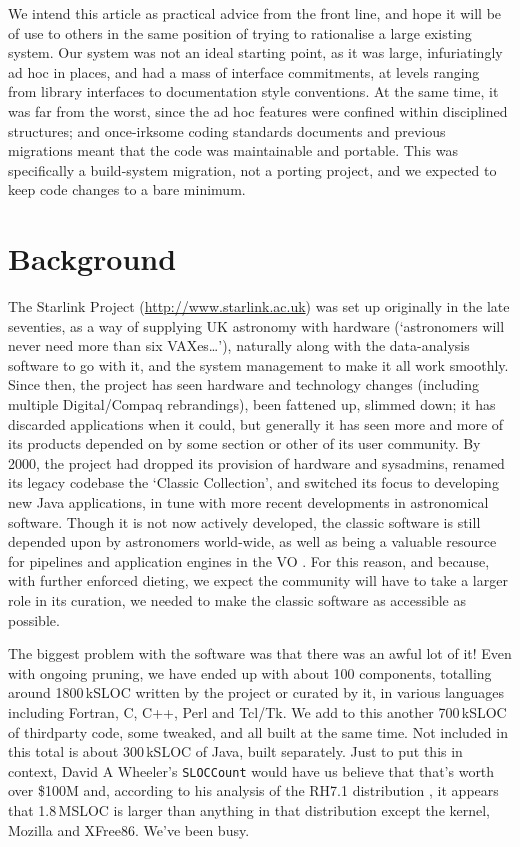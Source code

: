 \documentclass{speauth}
\begin{document}
We intend this article as practical advice from the front line, and
hope it will be of use to others in the same position of trying to
rationalise a large existing system.  Our system was not an ideal
starting point, as it was large, infuriatingly ad hoc in places, and
had a mass of interface commitments, at levels ranging from library
interfaces to documentation style conventions.  At the same time, it
was far from the worst, since the ad hoc features were confined within
disciplined structures; and once-irksome coding standards documents and
previous migrations meant that the code was maintainable and
portable.  This was specifically a build-system migration, not a
porting project, and we expected to keep code changes to a bare minimum.


\section{Background}
\label{s:background}


The Starlink Project (\url{http://www.starlink.ac.uk}) was set up
originally in the late seventies, as a way of supplying UK astronomy
with hardware (`astronomers will never need more than six
VAXes\dots'), naturally along with the data-analysis software to go
with it, and the system management to make it all work smoothly.
Since then, the project has seen hardware and technology changes
(including multiple Digital/Compaq rebrandings), been fattened up,
slimmed down; it has discarded applications when it could, but
generally it has seen more and more of its products depended on by
some section or other of its user community.  By 2000, the project had
dropped its provision of hardware and sysadmins, renamed its legacy
codebase the `Classic Collection', and switched its focus to
developing new Java applications, in tune with more recent
developments in astronomical software.  Though it is not now actively
developed, the classic software is still depended upon by astronomers
world-wide, as well as being a valuable resource for pipelines
\cite{cavanagh03,currie04} and application engines in the VO
\cite{giaretta05}.  For this reason, and because, with further
enforced dieting, we expect the community will have to take a larger
role in its curation, we needed to make the classic software as
accessible as possible.

The biggest problem with the software was that there was an awful lot
of it!  Even with ongoing pruning, we have ended up with about 100
components, totalling around 1800\,kSLOC written by the project or
curated by it, in various languages
including Fortran, C, C++, Perl and Tcl/Tk.  We add to this another
700\,kSLOC of thirdparty code, some tweaked, and all built at the same
time.  Not included in this total is about 300\,kSLOC of Java,
built separately.  Just to put this in context, David A
Wheeler's \texttt{SLOCCount} would have us believe that that's worth
over \$100M and, according to his analysis of the RH7.1 distribution
\cite{wheeler02}, it appears that 1.8\,MSLOC is larger than anything in
that distribution except the kernel, Mozilla and XFree86.  We've been busy.
\end{document}
